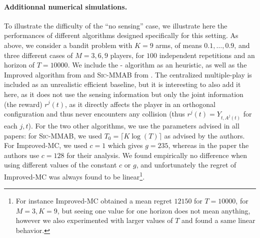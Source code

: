 \paragraph{Additionnal numerical simulations.}

To illustrate the difficulty of the ``no sensing'' case, we illustrate here the performances of different algorithms designed specifically for this setting.
As above, we consider a bandit problem with $K=9$ arms, of means $0.1,\dots,0.9$, and three different cases of $M=3,6,9$ players, for $100$ independent repetitions and an horizon of $T=10000$.
We include the \Selfish-\klUCB{} algorithm as an heuristic, as well as the Improved \MusicalChair{} algorithm from \cite{LugosiMehrabian18} and \textsc{Sic-MMAB} from \cite{BoursierPerchet18}.
The centralized multiple-play \klUCB{} is included as an unrealistic efficient baseline, but it is interesting to also add it here, as it does not use the sensing information but only the joint information (the reward) $r^j(t)$, as it directly affects the player in an orthogonal configuration and thus never encounters any collision (thus $r^j(t)=Y_{t,A^j(t)}$ for each $j,t$).
%
For the two other algorithms, we use the parameters advised in all papers: for \textsc{Sic-MMAB}, we used $T_0 = \lceil K \log(T) \rceil$ as advised by the authors.
For Improved-MC, we used $c=1$ which gives $g=235$, whereas in the paper the authors use $c=128$ for their analysis. We found empirically no difference when using different values of the constant $c$ or $g$, and unfortunately the regret of Improved-MC was always found to be linear\footnote{For instance Improved-MC obtained a mean regret $12150$ for $T=10000$, for $M=3,K=9$, but seeing one value for one horizon does not mean anything, however we also experimented with larger values of $T$ and found a same linear behavior.}.



